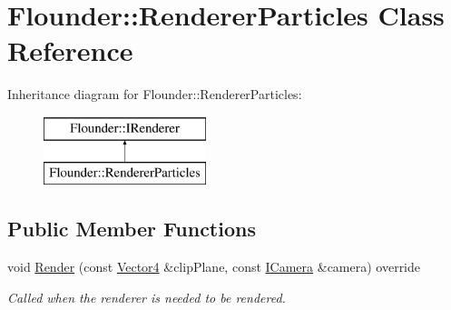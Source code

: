 \hypertarget{class_flounder_1_1_renderer_particles}{}\section{Flounder\+:\+:Renderer\+Particles Class Reference}
\label{class_flounder_1_1_renderer_particles}
Inheritance diagram for Flounder\+:\+:Renderer\+Particles\+:\begin{figure}[H]
\begin{center}
\leavevmode
\includegraphics[height=2.000000cm]{class_flounder_1_1_renderer_particles}
\end{center}
\end{figure}
\subsection*{Public Member Functions}
\begin{DoxyCompactItemize}
\item 
void \hyperlink{class_flounder_1_1_renderer_particles_a6ea635663814d5edea980422674fc107}{Render} (const \hyperlink{class_flounder_1_1_vector4}{Vector4} \&clip\+Plane, const \hyperlink{class_flounder_1_1_i_camera}{I\+Camera} \&camera) override
\begin{DoxyCompactList}\small\item\em Called when the renderer is needed to be rendered. \end{DoxyCompactList}\end{DoxyCompactItemize}
